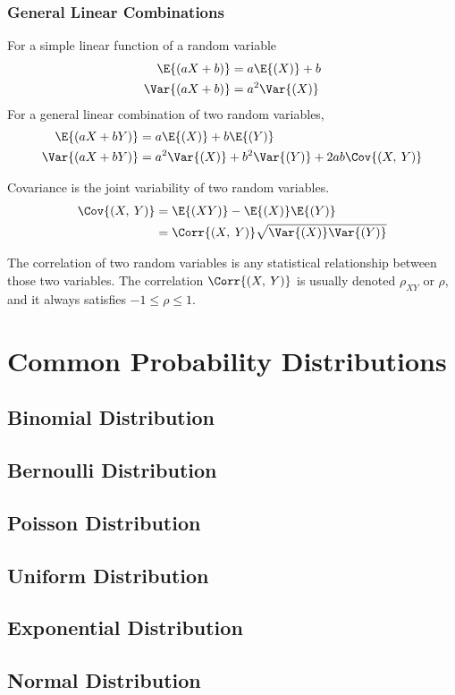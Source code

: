 \documentclass{article}
\begin{document}
\subsubsection{General Linear Combinations}
For a simple linear function of a random variable
\begin{align*}
    \E{\left( aX + b \right)}   & = a\E{\left( X \right)} + b \\
    \Var{\left( aX + b \right)} & = a^2\Var{\left( X \right)}
\end{align*}
For a general linear combination of two random variables,
\begin{align*}
    \E{\left( aX + bY \right)}   & = a\E{\left( X \right)} + b\E{\left( Y \right)}                                           \\
    \Var{\left( aX + bY \right)} & = a^2\Var{\left( X \right)} + b^2\Var{\left( Y \right)} + 2ab \Cov{\left( X,\: Y \right)}
\end{align*}
\begin{definition}[Covariance]
    Covariance is the joint variability of two random variables.
    \begin{align*}
        \Cov{\left( X,\: Y \right)} & = \E{\left( XY \right)} - \E{\left( X \right)} \E{\left( Y \right)}                 \\
                                    & = \Corr{\left( X,\: Y \right)} \sqrt{\Var{\left( X \right)} \Var{\left( Y \right)}}
    \end{align*}
\end{definition}
\begin{definition}[Correlation]
    The correlation of two random variables is any statistical \linebreak relationship between
    those two variables. The correlation $\Corr{\left( X,\: Y \right)}$ is usually denoted $\rho_{XY}$ or $\rho$,
    and it always satisfies $-1 \leq\rho\leq 1$.
\end{definition}
\section{Common Probability Distributions}
\subsection{Binomial Distribution}
\subsection{Bernoulli Distribution}
\subsection{Poisson Distribution}
\subsection{Uniform Distribution}
\subsection{Exponential Distribution}
\subsection{Normal Distribution}
\end{document}
